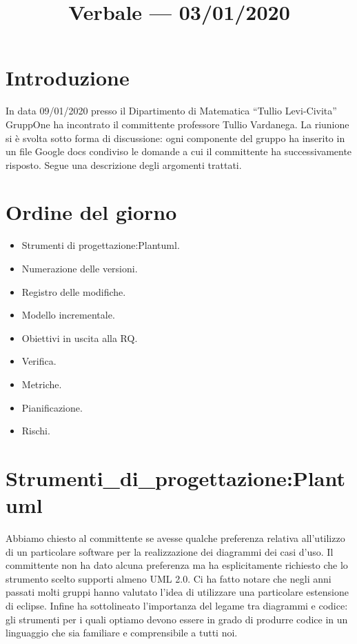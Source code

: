 \documentclass{article}
\title{Verbale --- 03/01/2020}
\begin{document}


\section{Introduzione}
\label{sec:introduzione}

In data 09/01/2020 presso il Dipartimento di Matematica ``Tullio Levi-Civita'' GruppOne ha incontrato il committente professore Tullio Vardanega. La riunione si è svolta sotto forma di discussione: ogni componente del gruppo ha inserito in un file Google docs condiviso le domande a cui il committente ha successivamente risposto. Segue una descrizione degli argomenti trattati.

\section{Ordine del giorno}%
\label{sec:ordine_del_giorno}

\begin{itemize}
  \item Strumenti di progettazione:Plantuml.
  \item Numerazione delle versioni.
  \item Registro delle modifiche.
  \item Modello incrementale.
  \item Obiettivi in uscita alla RQ.
  \item Verifica.
  \item Metriche.
  \item Pianificazione.
  \item Rischi.
\end{itemize}

\section{Strumenti_di_progettazione:Plantuml}%
\label{sec:strumenti_di_progettazione:Plantuml}

Abbiamo chiesto al committente se avesse qualche preferenza relativa all'utilizzo di un particolare software per la realizzazione dei diagrammi dei casi d'uso. Il committente non ha dato alcuna preferenza ma ha esplicitamente richiesto che lo strumento scelto supporti almeno UML 2.0. Ci ha fatto notare che negli anni passati molti gruppi hanno valutato l'idea di utilizzare una particolare estensione di eclipse. Infine ha sottolineato l'importanza del legame tra diagrammi e codice: gli strumenti per i quali optiamo devono essere in grado di produrre codice in un linguaggio che sia familiare e comprensibile a tutti noi.
\end{document}
